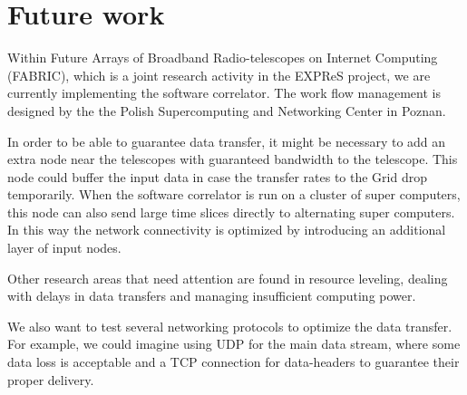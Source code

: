 \section{Future work}
Within Future Arrays of Broadband Radio-telescopes on Internet
Computing (FABRIC), which is a joint research activity in the EXPReS
project, we are currently implementing the software correlator. The
work flow management is designed by the the Polish Supercomputing and
Networking Center in Poznan.

In order to be able to guarantee data transfer, it might be necessary
to add an extra node near the telescopes with guaranteed bandwidth to
the telescope. This node could buffer the input data in case the
transfer rates to the Grid drop temporarily. When the software
correlator is run on a cluster of super computers, this node can also
send large time slices directly to alternating super computers. In
this way the network connectivity is optimized by introducing an
additional layer of input nodes.

Other research areas that need attention are found in resource
leveling, dealing with delays in data transfers and managing
insufficient computing power.

We also want to test several networking protocols to optimize the data
transfer. For example, we could imagine using UDP for the main data
stream, where some data loss is acceptable and a TCP connection for
data-headers to guarantee their proper delivery.
